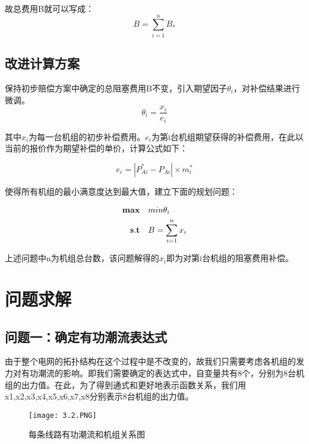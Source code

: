 \documentclass[12pt,a4paper]{ctexart}
\begin{document}
	故总费用B就可以写成：
	\begin{equation}
		B=\sum_{i=1}^{n} B_{*}
	\end{equation}
	
	
	
	\subsection*{改进计算方案}
	
	保持初步赔偿方案中确定的总阻塞费用B不变，引入期望因子$\theta_{i}$，对补偿结果进行微调。
	\begin{equation}
		\theta_{i} =\dfrac{x_{i}}{e_{i}}
		\label{3}
	\end{equation}
	
	其中$x_{i}$为每一台机组的初步补偿费用。$e_{i}$为第i台机组期望获得的补偿费用，在此以当前的报价作为期望补偿的单价，计算公式如下：
	
	\begin{equation}
		e_{i}=|P_{Ai}^{*}-P_{Ai}|\times m_{i}^{*}
		\label{4}
	\end{equation}
	
	使得所有机组的最小满意度达到最大值，建立下面的规划问题：
	
	\begin{equation*}
		\begin{split}
			{\bf max}\quad &min \theta_{i}\\
			{\bf s.t}\quad &B= \sum_{i=1}^{n}x_{i}\\
		\end{split}
	\end{equation*}
	
	上述问题中n为机组总台数，该问题解得的$x_{i}$即为对第i台机组的阻塞费用补偿。
	
\section{问题求解}
	\subsection{问题一：确定有功潮流表达式}
	由于整个电网的拓扑结构在这个过程中是不改变的，故我们只需要考虑各机组的发力对有功潮流的影响。即我们需要确定的表达式中，自变量共有8个，分别为8台机组的出力值。在此，为了得到通式和更好地表示函数关系，我们用x1,x2,x3,x4,x5,x6,x7,x8分别表示8台机组的出力值。
	
	\begin{figure}[!h]
		\centering	%
		\texttt{[image: 3.2.PNG]} %
		\caption{每条线路有功潮流和机组关系图}
	\end{figure}
\end{document}
